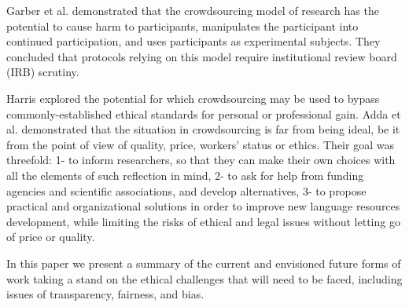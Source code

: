 \documentclass[11pt]{article}
\begin{document}
Garber et al. \cite{graber2013internet} demonstrated that the crowdsourcing model of research has the potential to cause harm to participants, manipulates the participant into continued participation, and uses participants as experimental subjects. They concluded that protocols relying on this model require institutional review board (IRB) scrutiny.

Harris \cite{harris2011dirty} explored the potential for which crowdsourcing may be used to bypass commonly-established ethical standards for personal or professional gain. 
% 
Adda et al. \cite{adda2011crowdsourcing} demonstrated that the situation in crowdsourcing is far from being ideal, be it from the point of view of quality, price, workers’ status or ethics. Their goal was threefold: 1- to inform researchers, so that they can make their own choices with all the elements of such reflection in mind, 2- to ask for help from funding agencies and scientific associations, and develop alternatives, 3- to propose practical
and organizational solutions in order to improve new language resources development, while limiting the risks of ethical and legal issues without letting go of price or quality.

In this paper we present a summary of the current and envisioned future forms of work taking a stand on the ethical challenges that will need to be faced, including issues of transparency, fairness, and bias.
\end{document}
